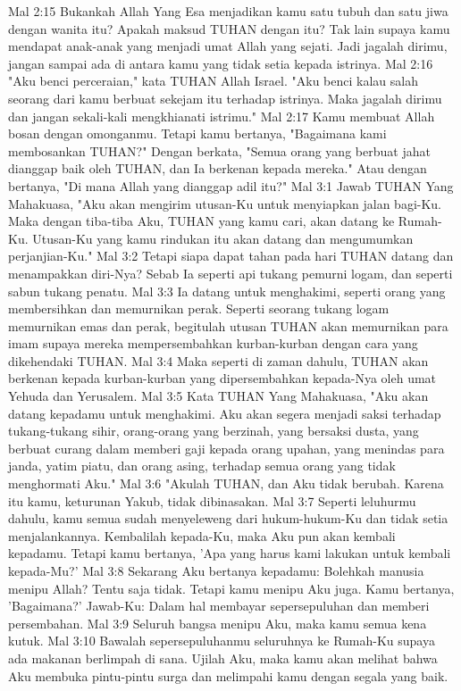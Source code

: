 Mal 2:15  Bukankah Allah Yang Esa menjadikan kamu satu tubuh dan satu jiwa dengan wanita itu? Apakah maksud TUHAN dengan itu? Tak lain supaya kamu mendapat anak-anak yang menjadi umat Allah yang sejati. Jadi jagalah dirimu, jangan sampai ada di antara kamu yang tidak setia kepada istrinya.
Mal 2:16  "Aku benci perceraian," kata TUHAN Allah Israel. "Aku benci kalau salah seorang dari kamu berbuat sekejam itu terhadap istrinya. Maka jagalah dirimu dan jangan sekali-kali mengkhianati istrimu."
Mal 2:17  Kamu membuat Allah bosan dengan omonganmu. Tetapi kamu bertanya, "Bagaimana kami membosankan TUHAN?" Dengan berkata, "Semua orang yang berbuat jahat dianggap baik oleh TUHAN, dan Ia berkenan kepada mereka." Atau dengan bertanya, "Di mana Allah yang dianggap adil itu?"
Mal 3:1  Jawab TUHAN Yang Mahakuasa, "Aku akan mengirim utusan-Ku untuk menyiapkan jalan bagi-Ku. Maka dengan tiba-tiba Aku, TUHAN yang kamu cari, akan datang ke Rumah-Ku. Utusan-Ku yang kamu rindukan itu akan datang dan mengumumkan perjanjian-Ku."
Mal 3:2  Tetapi siapa dapat tahan pada hari TUHAN datang dan menampakkan diri-Nya? Sebab Ia seperti api tukang pemurni logam, dan seperti sabun tukang penatu.
Mal 3:3  Ia datang untuk menghakimi, seperti orang yang membersihkan dan memurnikan perak. Seperti seorang tukang logam memurnikan emas dan perak, begitulah utusan TUHAN akan memurnikan para imam supaya mereka mempersembahkan kurban-kurban dengan cara yang dikehendaki TUHAN.
Mal 3:4  Maka seperti di zaman dahulu, TUHAN akan berkenan kepada kurban-kurban yang dipersembahkan kepada-Nya oleh umat Yehuda dan Yerusalem.
Mal 3:5  Kata TUHAN Yang Mahakuasa, "Aku akan datang kepadamu untuk menghakimi. Aku akan segera menjadi saksi terhadap tukang-tukang sihir, orang-orang yang berzinah, yang bersaksi dusta, yang berbuat curang dalam memberi gaji kepada orang upahan, yang menindas para janda, yatim piatu, dan orang asing, terhadap semua orang yang tidak menghormati Aku."
Mal 3:6  "Akulah TUHAN, dan Aku tidak berubah. Karena itu kamu, keturunan Yakub, tidak dibinasakan.
Mal 3:7  Seperti leluhurmu dahulu, kamu semua sudah menyeleweng dari hukum-hukum-Ku dan tidak setia menjalankannya. Kembalilah kepada-Ku, maka Aku pun akan kembali kepadamu. Tetapi kamu bertanya, 'Apa yang harus kami lakukan untuk kembali kepada-Mu?'
Mal 3:8  Sekarang Aku bertanya kepadamu: Bolehkah manusia menipu Allah? Tentu saja tidak. Tetapi kamu menipu Aku juga. Kamu bertanya, 'Bagaimana?' Jawab-Ku: Dalam hal membayar sepersepuluhan dan memberi persembahan.
Mal 3:9  Seluruh bangsa menipu Aku, maka kamu semua kena kutuk.
Mal 3:10  Bawalah sepersepuluhanmu seluruhnya ke Rumah-Ku supaya ada makanan berlimpah di sana. Ujilah Aku, maka kamu akan melihat bahwa Aku membuka pintu-pintu surga dan melimpahi kamu dengan segala yang baik.
